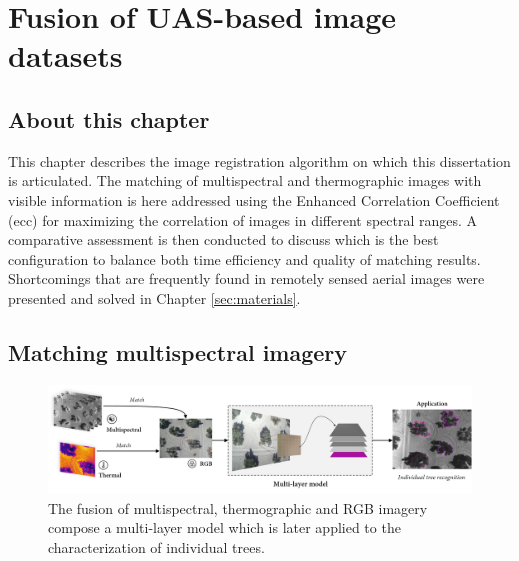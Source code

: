 \setchapterpreamble[u]{\margintoc}
\chapter{Fusion of UAS-based image datasets}
\label{sec:image_fusion}

\section*{About this chapter}

This chapter describes the image registration algorithm on which this dissertation is articulated. The matching of multispectral and thermographic images with visible information is here addressed using the Enhanced Correlation Coefficient (\acrshort{ecc}) for maximizing the correlation of images in different spectral ranges. A comparative assessment is then conducted to discuss which is the best configuration to balance both time efficiency and quality of matching results. Shortcomings that are frequently found in remotely sensed aerial images were presented and solved in Chapter \ref{sec:materials}. 

\section{Matching multispectral imagery}

\begin{figure}
    \includegraphics[width=\linewidth]{figs/image_fusion/summary_image_fusion.png}\hspace*{\fill}
    \caption{The fusion of multispectral, thermographic and RGB imagery compose a multi-layer model which is later applied to the characterization of individual trees.}
	\label{fig:image_fusion_framework}
\end{figure}

